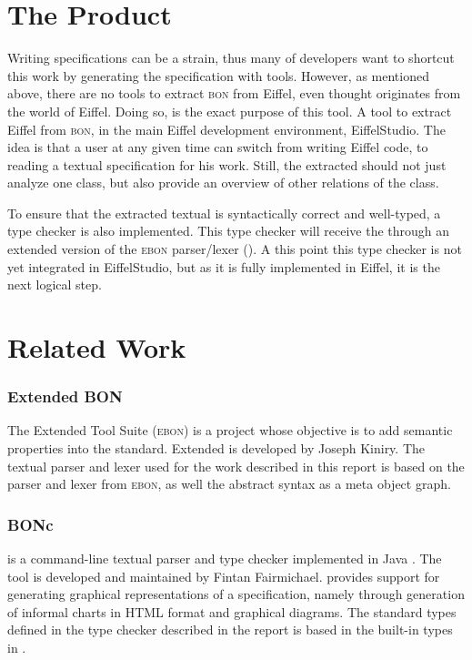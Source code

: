 \section{The Product}
Writing specifications can be a strain, thus many of developers want to shortcut this work by generating the specification with tools. However, as mentioned above, there are no tools to extract \textsc{bon} from Eiffel, even thought \bon{} originates from the world of Eiffel. Doing so, is the exact purpose of this tool. A tool to extract Eiffel from \textsc{bon}, in the main Eiffel development environment, EiffelStudio. The idea is that a user at any given time can switch from writing Eiffel code, to reading a textual \bon{} specification for his work. Still, the extracted \bon{} should not just analyze one class, but also provide an overview of other relations of the class.

To ensure that the extracted textual \bon{} is syntactically correct and well-typed, a type checker is also implemented. This type checker will receive the \bon{} through an extended version of the \textsc{ebon} parser/lexer (\cite{ebon}). A this point this type checker is not yet integrated in EiffelStudio, but as it is fully implemented in Eiffel, it is the next logical step. 

\section{Related Work}

\subsubsection{Extended BON}
The Extended \bon{} Tool Suite (\textsc{ebon}) is a project whose objective is to add semantic properties into the \bon{} standard. Extended \bon{} is developed by Joseph Kiniry. The textual \bon{} parser and lexer used for the work described in this report is based on the parser and lexer from \textsc{ebon}, as well the abstract syntax as a meta object graph.

\subsubsection{BONc}
 is a command-line textual \bon{} parser and type checker implemented in Java \cite{bonc}. The tool is developed and maintained by Fintan Fairmichael.  provides support for generating graphical representations of a \bon{} specification, namely through generation of informal charts in HTML format and graphical \bon{} diagrams. The standard types defined in the type checker described in the report is based in the built-in types in .

